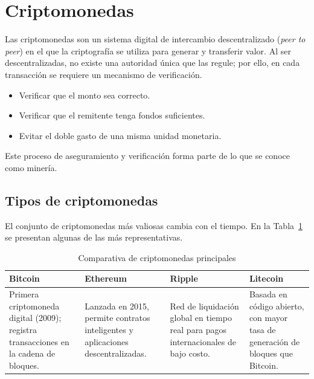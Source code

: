 \section{Criptomonedas}

Las criptomonedas son un sistema digital de intercambio
descentralizado (\textit{peer to peer}) en el que la criptografía se
utiliza para generar y transferir valor. Al ser descentralizadas, no
existe una autoridad única que las regule; por ello, en cada
transacción se requiere un mecanismo de verificación.

\begin{itemize}
  \item Verificar que el monto sea correcto.
  \item Verificar que el remitente tenga fondos suficientes.
  \item Evitar el doble gasto de una misma unidad monetaria.
\end{itemize}

Este proceso de aseguramiento y verificación forma parte de lo que se
conoce como minería.

\subsection{Tipos de criptomonedas}

El conjunto de criptomonedas más valiosas cambia con el tiempo. En la
Tabla~\ref{tab:cripto-comparativa} se presentan algunas de las más
representativas.

\begin{table}[ht]
  \centering
  \caption{Comparativa de criptomonedas principales}
  \label{tab:cripto-comparativa}
  \begin{tabularx}{\textwidth}{XXXX}
    \toprule
    \textbf{Bitcoin} & \textbf{Ethereum} & \textbf{Ripple} &
    \textbf{Litecoin} \\ \midrule

    Primera criptomoneda digital (2009); registra transacciones en la
    cadena de bloques. &
    Lanzada en 2015, permite contratos inteligentes y aplicaciones
    descentralizadas. &
    Red de liquidación global en tiempo real para pagos
    internacionales de bajo costo. &
    Basada en código abierto, con mayor tasa de generación de bloques
    que Bitcoin. \\

    \bottomrule
  \end{tabularx}
\end{table}

